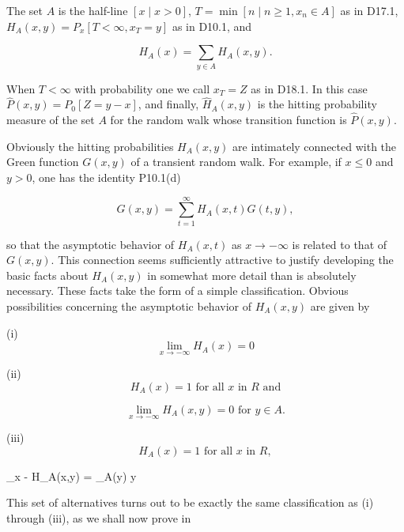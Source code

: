 The set $A$ is the half-line $[x \mid x > 0]$, $T = \min [n \mid n \geq 1, x_n \in A]$ as in D17.1, $H_A(x,y) = P_x[T < \infty, x_T = y]$ as in D10.1, and

$$H_A(x) = \sum_{y \in A} H_A(x,y).$$

When $T < \infty$ with probability one we call $x_T = Z$ as in D18.1. In this case $\hat{P}(x,y) = P_0[Z = y - x]$, and finally, $\hat{H}_A(x,y)$ is the hitting probability measure of the set $A$ for the random walk whose transition function is $\hat{P}(x,y)$.

Obviously the hitting probabilities $H_A(x,y)$ are intimately connected with the Green function $G(x,y)$ of a transient random walk. For example, if $x \leq 0$ and $y > 0$, one has the identity P10.1(d)

$$G(x,y) = \sum_{t=1}^{\infty} H_A(x,t)G(t,y),$$

so that the asymptotic behavior of $H_A(x,t)$ as $x \rightarrow -\infty$ is related to that of $G(x,y)$. This connection seems sufficiently attractive to justify developing the basic facts about $H_A(x,y)$ in somewhat more detail than is absolutely necessary. These facts take the form of a simple classification. Obvious possibilities concerning the asymptotic behavior of $H_A(x,y)$ are given by

(i) $$\lim_{x \rightarrow -\infty} H_A(x) = 0$$

(ii) $$H_A(x) = 1 \text{ for all } x \text{ in } R \text{ and}$$

$$\lim_{x \rightarrow -\infty} H_A(x,y) = 0 \text{ for } y \in A.$$

(iii) $$H_A(x) = 1 \text{ for all } x \text{ in } R,$$

$$\lim_{x \rightarrow -\infty} H_A(x,y) = \gamma_A(y)  y \in

This set of alternatives turns out to be exactly the same classification as (i) through (iii), as we shall now prove in